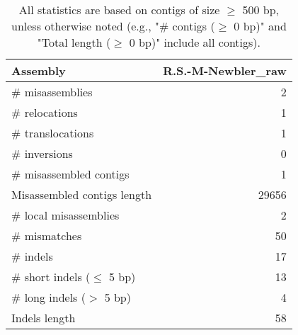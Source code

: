 \documentclass[12pt,a4paper]{article}
\begin{document}
\begin{table}[ht]
\begin{center}
\caption{All statistics are based on contigs of size $\geq$ 500 bp, unless otherwise noted (e.g., "\# contigs ($\geq$ 0 bp)" and "Total length ($\geq$ 0 bp)" include all contigs).}
\begin{tabular}{|l*{1}{|r}|}
\hline
Assembly & R.S.-M-Newbler\_raw \\ \hline
\# misassemblies & 2 \\ \hline
\hspace{5mm}\# relocations & 1 \\ \hline
\hspace{5mm}\# translocations & 1 \\ \hline
\hspace{5mm}\# inversions & 0 \\ \hline
\# misassembled contigs & 1 \\ \hline
Misassembled contigs length & 29656 \\ \hline
\# local misassemblies & 2 \\ \hline
\# mismatches & 50 \\ \hline
\# indels & 17 \\ \hline
\hspace{5mm}\# short indels ($\leq$ 5 bp) & 13 \\ \hline
\hspace{5mm}\# long indels ($>$ 5 bp) & 4 \\ \hline
Indels length & 58 \\ \hline
\end{tabular}
\end{center}
\end{table}
\end{document}
